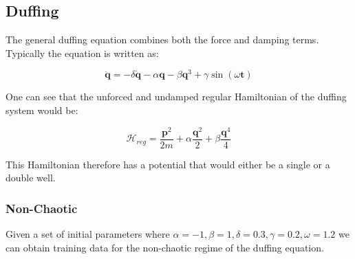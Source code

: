 \documentclass[twoside]{article}
\begin{document}
\subsection{Duffing}

The general duffing equation combines both the force and damping terms. Typically the equation is written as:

\begin{equation}
\ddot{\mathbf{q}} = -\delta \dot{\mathbf{q}} -\alpha \mathbf{q} -\beta \mathbf{q}^3 +\gamma \sin(\omega \mathbf{t}) 
\end{equation}

One can see that the unforced and undamped regular Hamiltonian of the duffing system would be:

\begin{equation}
\mathcal{H}_{reg} = \frac{\mathbf{p}^2}{2m}+ \alpha \frac{\mathbf{q}^2}{2} + \beta \frac{\mathbf{q}^4}{4}
\end{equation}

This Hamiltonian therefore has a potential that would either be a single or a double well.


\subsubsection{Non-Chaotic}

Given a set of initial parameters where $\alpha =-1,\beta=1,\delta=0.3,\gamma=0.2,\omega=1.2$ we can obtain training data for the non-chaotic regime of the duffing equation.
\end{document}
